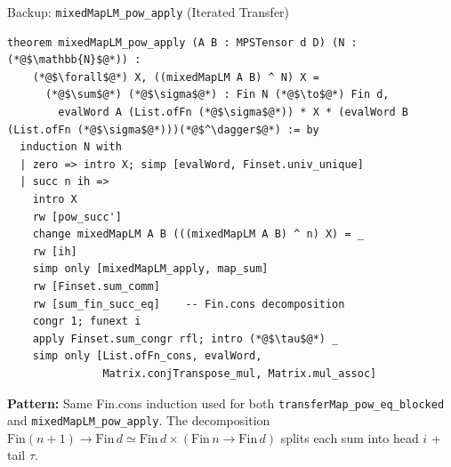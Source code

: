 \documentclass[aspectratio=169,10pt]{beamer}
\begin{document}
\begin{frame}[fragile]{Backup: \texttt{mixedMapLM\_pow\_apply} (Iterated Transfer)}
\vspace{-0.7em}
\begin{lstlisting}[basicstyle=\ttfamily\fontsize{4.5}{5.5}\selectfont\color{white}]
theorem mixedMapLM_pow_apply (A B : MPSTensor d D) (N : (*@$\mathbb{N}$@*)) :
    (*@$\forall$@*) X, ((mixedMapLM A B) ^ N) X =
      (*@$\sum$@*) (*@$\sigma$@*) : Fin N (*@$\to$@*) Fin d,
        evalWord A (List.ofFn (*@$\sigma$@*)) * X * (evalWord B (List.ofFn (*@$\sigma$@*)))(*@$^\dagger$@*) := by
  induction N with
  | zero => intro X; simp [evalWord, Finset.univ_unique]
  | succ n ih =>
    intro X
    rw [pow_succ']
    change mixedMapLM A B (((mixedMapLM A B) ^ n) X) = _
    rw [ih]
    simp only [mixedMapLM_apply, map_sum]
    rw [Finset.sum_comm]
    rw [sum_fin_succ_eq]    -- Fin.cons decomposition
    congr 1; funext i
    apply Finset.sum_congr rfl; intro (*@$\tau$@*) _
    simp only [List.ofFn_cons, evalWord,
               Matrix.conjTranspose_mul, Matrix.mul_assoc]
\end{lstlisting}
\vspace{0.1em}
{\small\textbf{Pattern:} Same Fin.cons induction used for both \texttt{transferMap\_pow\_eq\_blocked} and \texttt{mixedMapLM\_pow\_apply}. The decomposition
$\mathrm{Fin}(n+1) \to \mathrm{Fin}\,d \simeq  \mathrm{Fin}\,d \times (\mathrm{Fin}\,n \to \mathrm{Fin}\,d)$
splits each sum into head $i$ + tail $\tau$.}
\end{frame}
\end{document}
